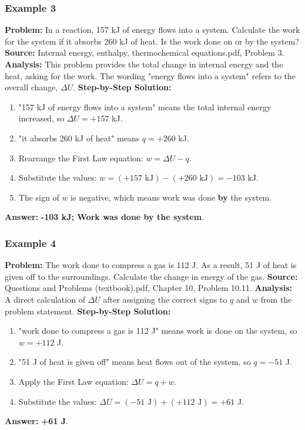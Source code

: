 \documentclass{article}
\begin{document}
\subsubsection{Example 3}
\textbf{Problem:} In a reaction, 157 kJ of energy flows into a system. Calculate the work for the system if it absorbs 260 kJ of heat. Is the work done on or by the system?
\textbf{Source:} Internal energy, enthalpy, thermochemical equations.pdf, Problem 3.
\textbf{Analysis:} This problem provides the total change in internal energy and the heat, asking for the work. The wording "energy flows into a system" refers to the overall change, $\Delta U$.
\textbf{Step-by-Step Solution:}
\begin{enumerate}
    \item "157 kJ of energy flows into a system" means the total internal energy increased, so $\Delta U = +157$ kJ.
    \item "it absorbs 260 kJ of heat" means $q = +260$ kJ.
    \item Rearrange the First Law equation: $w = \Delta U - q$.
    \item Substitute the values: $w = (+157 \text{ kJ}) - (+260 \text{ kJ}) = -103$ kJ.
    \item The sign of $w$ is negative, which means work was done \textbf{by} the system.
\end{enumerate}
\textbf{Answer:} \textbf{-103 kJ; Work was done by the system}.

\subsubsection{Example 4}
\textbf{Problem:} The work done to compress a gas is 112 J. As a result, 51 J of heat is given off to the surroundings. Calculate the change in energy of the gas.
\textbf{Source:} Questions and Problems (textbook).pdf, Chapter 10, Problem 10.11.
\textbf{Analysis:} A direct calculation of $\Delta U$ after assigning the correct signs to $q$ and $w$ from the problem statement.
\textbf{Step-by-Step Solution:}
\begin{enumerate}
    \item "work done to compress a gas is 112 J" means work is done on the system, so $w = +112$ J.
    \item "51 J of heat is given off" means heat flows out of the system, so $q = -51$ J.
    \item Apply the First Law equation: $\Delta U = q + w$.
    \item Substitute the values: $\Delta U = (-51 \text{ J}) + (+112 \text{ J}) = +61$ J.
\end{enumerate}
\textbf{Answer:} \textbf{+61 J}.
\end{document}
